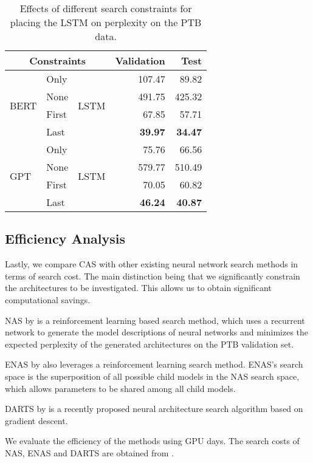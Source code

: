 \documentclass[11pt,a4paper]{article}
\begin{document}
\begin{table}[tb]
{\centering
\begin{tabular}{|lll|r|r|}
\hline
\multicolumn{3}{|c|}{\textbf{Constraints}} & \textbf{Validation} & \textbf{Test} \\ \hline
\multirow{4}{*}{BERT} 
& Only & \multirow{4}{*}{LSTM}                       & 107.47                            & 89.82                              \\ 
& None &                        & 491.75                            & 425.32                             \\ 
& First&                       & 67.85                             & 57.71                              \\ 
& Last&                        & {\bf 39.97}                             & {\bf 34.47}                              \\ \hline 
\multirow{4}{*}{GPT} 
& Only & \multirow{4}{*}{LSTM}                       & 75.76                             & 66.56                              \\ 
& None &                         & 579.77                            & 510.49                             \\ 
& First &                        & 70.05                             & 60.82                              \\ 
& Last &                         & {\bf 46.24}                             & {\bf 40.87}                              \\ \hline
\end{tabular}
\caption{Effects of different search constraints for placing the LSTM
  on perplexity on the PTB data. }
\label{tab:effect}
}
\end{table}

\subsection{Efficiency Analysis}

Lastly, we compare CAS with other existing neural network search
methods in terms of search cost. The main distinction being that we
significantly constrain the architectures to be investigated. This
allows us to obtain significant computational savings. 
\begin{description*}
\item[NAS] by \cite{ZophL16} is a reinforcement learning based search method, which uses a recurrent network to generate the model descriptions of neural networks and minimizes the expected perplexity of the generated architectures on the PTB validation set.
\item[ENAS] by \cite{PhamGZLD18} also leverages a reinforcement learning search method. ENAS's search space is the superposition of all possible child models in the NAS search space, which allows parameters to be shared among all child models.
\item[DARTS] by \cite{Liu09055} is a recently proposed neural architecture search algorithm based on gradient descent. 
\end{description*}
We evaluate the efficiency of the methods using GPU days. The search costs of NAS, ENAS and DARTS are obtained from  \cite{Liu09055}.
\end{document}
